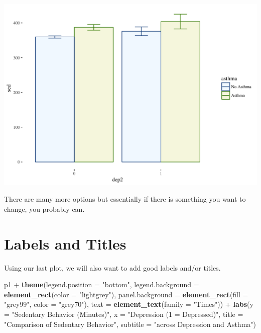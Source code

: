 \documentclass[]{tufte-book}
\newenvironment{Shaded}{}{}
\newcommand{\KeywordTok}[1]{\textcolor[rgb]{0.00,0.44,0.13}{\textbf{#1}}}
\newcommand{\DataTypeTok}[1]{\textcolor[rgb]{0.56,0.13,0.00}{#1}}
\newcommand{\StringTok}[1]{\textcolor[rgb]{0.25,0.44,0.63}{#1}}
\newcommand{\OperatorTok}[1]{\textcolor[rgb]{0.40,0.40,0.40}{#1}}
\newcommand{\NormalTok}[1]{#1}
\theoremstyle{definition}
\theoremstyle{definition}
\theoremstyle{remark}
\begin{document}
\includegraphics{_main_files/figure-latex/unnamed-chunk-152-1}

There are many more options but essentially if there is something you
want to change, you probably can.

\section*{Labels and Titles}\label{labels-and-titles}

Using our last plot, we will also want to add good labels and/or titles.

\begin{Shaded}
\begin{Highlighting}[]
\NormalTok{p1 }\OperatorTok{+}\StringTok{ }\KeywordTok{theme}\NormalTok{(}\DataTypeTok{legend.position =} \StringTok{"bottom"}\NormalTok{, }\DataTypeTok{legend.background =} \KeywordTok{element_rect}\NormalTok{(}\DataTypeTok{color =} \StringTok{"lightgrey"}\NormalTok{), }
    \DataTypeTok{panel.background =} \KeywordTok{element_rect}\NormalTok{(}\DataTypeTok{fill =} \StringTok{"grey99"}\NormalTok{, }
        \DataTypeTok{color =} \StringTok{"grey70"}\NormalTok{), }\DataTypeTok{text =} \KeywordTok{element_text}\NormalTok{(}\DataTypeTok{family =} \StringTok{"Times"}\NormalTok{)) }\OperatorTok{+}\StringTok{ }
\StringTok{    }\KeywordTok{labs}\NormalTok{(}\DataTypeTok{y =} \StringTok{"Sedentary Behavior (Minutes)"}\NormalTok{, }\DataTypeTok{x =} \StringTok{"Depression (1 = Depressed)"}\NormalTok{, }
        \DataTypeTok{title =} \StringTok{"Comparison of Sedentary Behavior"}\NormalTok{, }
        \DataTypeTok{subtitle =} \StringTok{"across Depression and Asthma"}\NormalTok{)}
\end{Highlighting}
\end{Shaded}
\end{document}
